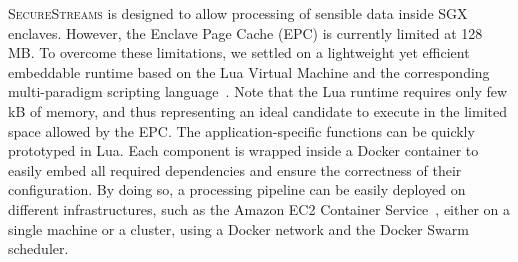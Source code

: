 \textsc{SecureStreams} is designed to allow processing of sensible data inside SGX enclaves.
However, the Enclave Page Cache (EPC) is currently limited at 128 MB.
To overcome these limitations, we settled on a lightweight yet efficient embeddable runtime based on the Lua Virtual Machine\cite{ierusalimschy_luaextensible_1996} and the corresponding multi-paradigm scripting language~\cite{lualang}.
Note that the Lua runtime requires only few kB of memory, and thus representing an ideal candidate to execute in the limited space allowed by the EPC.
The application-specific functions can be quickly prototyped in Lua.
Each component is wrapped inside a Docker container to easily embed all required dependencies and ensure the correctness of their configuration.
By doing so, a processing pipeline can be easily deployed on different infrastructures, such as the Amazon EC2 Container Service~\cite{awsec2container}, either on a single machine or a cluster, using a Docker network and the Docker Swarm\cite{docker:swarm_2016} scheduler.

